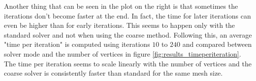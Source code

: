 \documentclass[a4paper,twoside,12pt,nochapterprefix]{scrbook}
\begin{document}
Another thing that can be seen in the plot on the right is that sometimes the iterations don't become faster at the end. In fact, the time for later iterations can even be higher than for early iterations. This seems to happen only with the standard solver and not when using the coarse method.\newline
Following this, an average "time per iteration" is computed using iterations $10$ to $240$ and compared between solver mode and the number of vertices in figure \ref{fig:results_timeperiteration}. The time per iteration seems to scale linearly with the number of vertices and the coarse solver is consistently faster than standard for the same mesh size.\newline %



\end{document}
